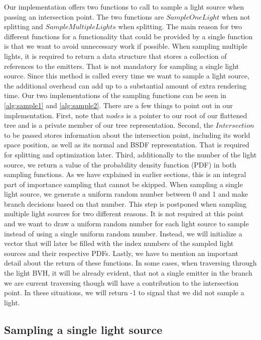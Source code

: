 Our implementation offers two functions to call to sample a light source when passing an intersection point. The two functions are $SampleOneLight$ when not splitting and $SampleMultipleLights$ when splitting. The main reason for two different functions for a functionality that could be provided by a single function is that we want to avoid unnecessary work if possible. When sampling multiple lights, it is required to return a data structure that stores a collection of references to the emitters. That is not mandatory for sampling a single light source. Since this method is called every time we want to sample a light source, the additional overhead can add up to a substantial amount of extra rendering time. Our two implementations of the sampling functions can be seen in \ref{alg:sample1} and \ref{alg:sample2}. There are a few things to point out in our implementation. First, note that $nodes$ is a pointer to our root of our flattened tree and is a private member of our tree representation. Second, the $Intersection$ to be passed stores information about the intersection point, including its world space position, as well as its normal and BSDF representation. That is required for splitting and optimization later. Third, additionally to the number of the light source, we return a value of the probability density function (PDF) in both sampling functions. As we have explained in earlier sections, this is an integral part of importance sampling that cannot be skipped. When sampling a single light source, we generate a uniform random number between 0 and 1 and make branch decisions based on that number. This step is postponed when sampling multiple light sources for two different reasons. It is not required at this point and we want to draw a uniform random number for each light source to sample instead of using a single uniform random number. Instead, we will initialize a vector that will later be filled with the index numbers of the sampled light sources and their respective PDFs. Lastly, we have to mention an important detail about the return of these functions. In some cases, when traversing through the light BVH, it will be already evident, that not a single emitter in the branch we are current traversing though will have a contribution to the intersection point. In these situations, we will return -1 to signal that we did not sample a light.

\subsection{Sampling a single light source}
\label{subs:single}

